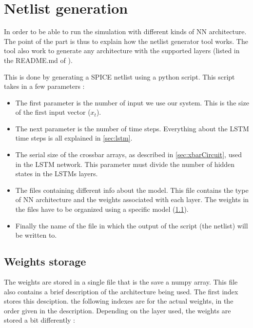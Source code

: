 \section{Netlist generation}
\label{sec:netlist}

In order to be able to run the simulation with different kinds of \ac{NN} architecture. The point of the part is thus to explain how the netlist generator tool works. The tool also work to generate any architecture with the supported layers (listed in the README.md of \cite{lstmGen}).

This is done by generating a SPICE netlist using a python script. This script takes in a few parameters :

\begin{itemize}
  \item The first parameter is the number of input we use our system. This is the size of the first input vector ($x_t$).
  \item The next parameter is the number of time steps. Everything about the \ac{LSTM} time steps is all explained in \cref{sec:lstm}.
  \item The serial size of the crossbar arrays, as described in \cref{sec:xbarCircuit}, used in the \ac{LSTM} network. This parameter must divide the number of hidden states in the \acp{LSTM} layers.
  \item The files containing different info about the model. This file contains the type of \ac{NN} architecture and the weights associated with each layer. The weights in the files have to be organized using a specific model (\cref{subsec:weiStore}).
  \item Finally the name of the file in which the output of the script (the netlist) will be written to.
\end{itemize}

\subsection{Weights storage}\label{subsec:weiStore}


The weights are stored in a single file that is the save a numpy array. This file also contains a brief description of the architecture being used. The first index stores this desciption. the following indexes are for the actual weights, in the order given in the description. Depending on the layer used, the weights are stored a bit differently :

